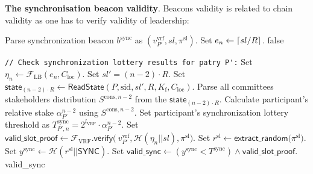 \bigbreak
\bigbreak
\noindent
{}
\textbf{The synchronisation beacon validity}.\label{apndx:sync-beacon-validity-protocol}
Beacons validity is related to chain validity as one has to verify validity of leadership:
\begin{protocol}
    \caption{$\textsf{ValidBeacon}(P, \text{sid}, R, l_{\text{VRF}}, K_{\text{f}}, b^{\text{sync}}, \mathcal{C}_{\text{loc}})$}
    \begin{algorithmic}[1]
        \State Parse synchronization beacon $b^{\text{sync}}$ as $(v_{P'}^{\text{vrf}}, sl, \pi^{\text{sl}})$.
        \State Set $e_n \leftarrow \lceil sl/\\R \rceil$.
            \State \Return \textsf{false}
        \EndIf

        \noindent
        \lstinline|// Check synchronization lottery results for patry P':|
        \State Set ${\eta_{n} \leftarrow \mathcal{F}_{\text{LB}}(e_{n}, C_{\text{loc}})}$.
        \State Set $sl' = (n - 2)\cdot R$.
        \State Set $\textsf{state}_{(n - 2)\cdot R} \leftarrow \textsf{ReadState}(P, \text{sid}, sl', R, K_{\text{f}}, C_{\text{loc}})$.
        \State Parse all committees stakeholders distribution $S^{\text{cons}, n - 2}$ from the $\textsf{state}_{(n - 2)\cdot R}$.
        \State Calculate participant's relative stake $\alpha^{n-2}_{P'}$ using $S^{\text{cons}, {n - 2}}$.
        \State Set participant's synchronization lottery threshold as $T_{P', n}^{\text{sync}} = 2^{l_{\text{VRF}}} \cdot \alpha^{n-2}_{P'}$.
        \State Set $\textsf{valid\_slot\_proof} \leftarrow \mathcal{F}_{\text{VRF}}\textsf{.verify(}\
        v_{P'}^{\text{vrf}}, \mathcal{H}(\eta_n || sl),\pi^{\text{sl}} \textsf{)}$.
        \State Set ${r^{\text{sl}} \leftarrow \textsf{extract\_random(}\pi^{\text{sl}}\textsf{)}}$.
        \State Set ${y^{\text{sync}} \leftarrow {\mathcal{H}(r^{\text{sl}} || \textsf{SYNC})}}$.
        \State Set ${\textsf{valid\_sync} \leftarrow (y^{\text{sync}} < T^{\text{sync}}) \wedge \textsf{valid\_slot\_proof}}$.
        \State \Return \textsf{valid\_sync}

    \end{algorithmic}\label{alg:sync-beacon-validity-protocol}
\end{protocol}